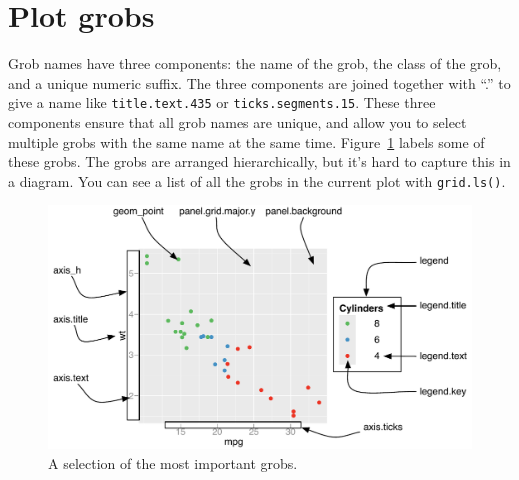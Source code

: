 \section{Plot grobs}
\label{sec:plot-grobs}

Grob names have three components: the name of the grob, the class of the grob, and a unique numeric suffix.  The three components are joined together with ``.'' to give a name like {\tt title.text.435} or {\tt ticks.segments.15}.  These three components ensure that all grob names are unique, and allow you to select multiple grobs with the same name at the same time.  Figure~\ref{fig:grobs} labels some of these grobs.  The grobs are arranged hierarchically, but it's hard to capture this in a diagram.  You can see a list of all the grobs in the current plot with {\tt grid.ls()}.  

\begin{figure}[htbp]
  \centering
    \includegraphics[width=\linewidth]{grid-grobs}
  \caption{A selection of the most important grobs.}
  \label{fig:grobs}
\end{figure}


